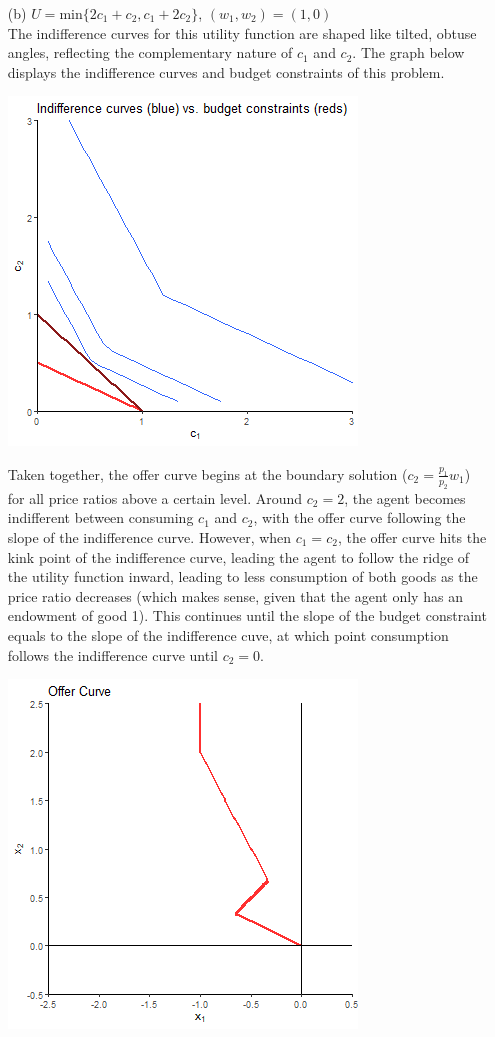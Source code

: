 \documentclass{article}
\begin{document}
\begin{itemize}
	\pagebreak
	\item[(b)] $U=\text{min}\{2c_1+c_2,c_1+2c_2\}$, $(w_1,w_2)=(1,0)$
		\smallskip \\
		The indifference curves for this utility function are shaped like tilted, obtuse angles, reflecting the complementary nature of $c_1$ and $c_2$. The graph below displays the indifference curves and budget constraints of this problem.
		\begin{center}
			\includegraphics[scale=.6]{2b_IC-and-BC.png}
		\end{center}
		Taken together, the offer curve begins at the boundary solution ($c_2=\frac{p_1}{p_2}w_1$) for all price ratios above a certain level. Around $c_2=2$, the agent becomes indifferent between consuming $c_1$ and $c_2$, with the offer curve following the slope of the indifference curve. However, when $c_1=c_2$, the offer curve hits the kink point of the indifference curve, leading the agent to follow the ridge of the utility function inward, leading to less consumption of both goods as the price ratio decreases (which makes sense, given that the agent only has an endowment of good 1). This continues until the slope of the budget constraint equals to the slope of the indifference cuve, at which point consumption follows the indifference curve until $c_2=0$.
		\begin{center}
			\includegraphics[scale=.6]{2b_offer-curve.png}
		\end{center}
		

\end{itemize}
\end{document}
